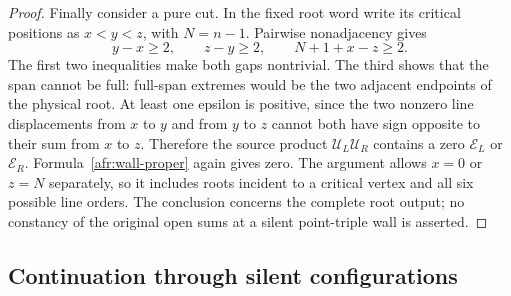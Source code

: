 \begin{proof}
Finally consider a pure cut. In the fixed root word write its critical
positions as $x<y<z$, with $N=n-1$. Pairwise nonadjacency gives
\begin{equation}\label{as7:pure-gaps}
y-x\geq2,\qquad z-y\geq2,\qquad N+1+x-z\geq2.
\end{equation}
The first two inequalities make both gaps nontrivial. The third shows
that the span cannot be full: full-span extremes would be the two
adjacent endpoints of the physical root. At least one epsilon is
positive, since the two nonzero line displacements from $x$ to $y$
and from $y$ to $z$ cannot both have sign opposite to their sum from
$x$ to $z$. Therefore the source product
$\mathcal U_L\mathcal U_R$ contains a zero $\mathcal E_L$ or
$\mathcal E_R$. Formula~\eqref{afr:wall-proper} again gives zero.
The argument allows $x=0$ or $z=N$ separately, so it includes roots
incident to a critical vertex and all six possible line orders.
The conclusion concerns the complete root output; no constancy of
the original open sums at a silent point-triple wall is asserted.
\end{proof}

\subsection{Continuation through silent configurations}


